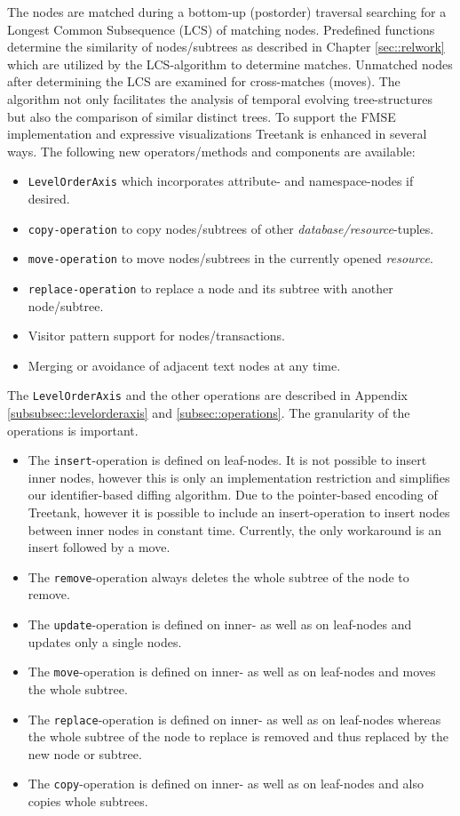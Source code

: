 The nodes are matched during a bottom-up (postorder) traversal searching for a Longest Common Subsequence (LCS) of matching nodes. Predefined functions determine the similarity of nodes/subtrees as described in Chapter \ref{sec::relwork} which are utilized by the LCS-algorithm to determine matches. Unmatched nodes after determining the LCS are examined for cross-matches (moves). The algorithm not only facilitates the analysis of temporal evolving tree-structures but also the comparison of similar distinct trees. To support the FMSE implementation and expressive visualizations Treetank is enhanced in several ways. The following new operators/methods and components are available:

\begin{itemize}
\item \texttt{LevelOrderAxis} which incorporates attribute- and namespace-nodes if desired.
\item \texttt{copy-operation} to copy nodes/subtrees of other \emph{database/resource}-tuples.
\item \texttt{move-operation} to move nodes/subtrees in the currently opened \emph{resource}.
\item \texttt{replace-operation} to replace a node and its subtree with another node/subtree.
\item Visitor pattern support for nodes/transactions.
\item Merging or avoidance of adjacent text nodes at any time.
\end{itemize}

The \texttt{LevelOrderAxis} and the other operations are described in Appendix \ref{subsubsec::levelorderaxis} and \ref{subsec::operations}. The granularity of the operations is important. 

\begin{itemize}
\item The \texttt{insert}-operation is defined on leaf-nodes. It is not possible to insert inner nodes, however this is only an implementation restriction and simplifies our identifier-based diffing algorithm. Due to the pointer-based encoding of Treetank, however it is possible to include an insert-operation to insert nodes between inner nodes in constant time. Currently, the only workaround is an insert followed by a move.
\item The \texttt{remove}-operation always deletes the whole subtree of the node to remove.
\item The \texttt{update}-operation is defined on inner- as well as on leaf-nodes and updates only a single nodes.
\item The \texttt{move}-operation is defined on inner- as well as on leaf-nodes and moves the whole subtree.
\item The \texttt{replace}-operation is defined on inner- as well as on leaf-nodes whereas the whole subtree of the node to replace is removed and thus replaced by the new node or subtree.
\item The \texttt{copy}-operation is defined on inner- as well as on leaf-nodes and also copies whole subtrees.
\end{itemize}

